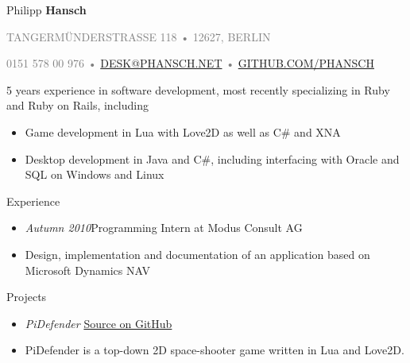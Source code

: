 \documentclass[12pt]{article}
\begin{document}
\thispagestyle{empty}



{\Huge Philipp \textbf{\textcolor{RedOrange}{Hansch}}}

{\footnotesize
  \textcolor{Gray}{
    \uppercase{Tangermünderstrasse 118}
    \textcolor{RedOrange}{•}
    \uppercase{12627, Berlin}
  }

  \textcolor{Gray}{
    0151 578 00 976
    \textcolor{RedOrange}{•}
    \uppercase{\href{mailto:desk@phansch.net}{desk@phansch.net} }
    \textcolor{RedOrange}{•}
    \uppercase{\href{http://github.com/phansch}{github.com/phansch}}
  }
}

\vspace{0.5cm}

5 years experience in software development, most recently specializing in Ruby and Ruby on Rails, including

\begin{itemize}
  \setlength{\itemsep}{0.1cm}
  \setlength{\parskip}{0.1cm}
  \item Game development in Lua with Love2D as well as C\# and XNA
  \item Desktop development in Java and C\#, including interfacing with Oracle and SQL on Windows and Linux
\end{itemize}
\vspace{0.5cm}

\textcolor{RedOrange}{\Large Experience}
\begin{itemize}
  \setlength{\itemsep}{0cm}
  \setlength{\parskip}{0cm}

  \item[] \emph{Autumn 2010}\hfill Programming Intern at Modus Consult AG
  \item[] Design, implementation and documentation of an application based on Microsoft Dynamics NAV
\end{itemize}

\vspace{0.5cm}
\textcolor{RedOrange}{\Large Projects}

\begin{itemize}
  \setlength{\itemsep}{0cm}
  \setlength{\parskip}{0cm}
  \item[] \emph{PiDefender} \hfill \href{https://github.com/phansch/PiDefender}{Source on GitHub}

  \item[] PiDefender is a top-down 2D space-shooter game written in Lua and Love2D.
\end{itemize}
\end{document}
